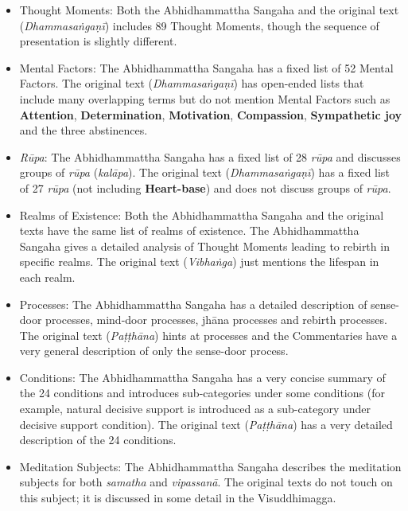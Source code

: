\begin{itemize}

\item Thought Moments: Both the Abhidhammattha Sangaha and the original text (\textit{Dhammasaṅgaṇī}) includes 89 Thought Moments, though the sequence of presentation is slightly different.

\item Mental Factors: The Abhidhammattha Sangaha has a fixed list of 52 Mental Factors. The original text (\textit{Dhammasaṅgaṇī}) has open-ended lists that include many overlapping terms but do not mention Mental Factors such as \textbf{Attention}, \textbf{Determination}, \textbf{Motivation}, \textbf{Compassion}, \textbf{Sympathetic joy} and the three abstinences.

\item \textit{Rūpa}: The Abhidhammattha Sangaha has a fixed list of 28 \textit{rūpa} and discusses groups of \textit{rūpa} (\textit{kalāpa}). The original text (\textit{Dhammasaṅgaṇī}) has a fixed list of 27 \textit{rūpa} (not including \textbf{Heart-base}) and does not discuss groups of \textit{rūpa}.

\item Realms of Existence: Both the Abhidhammattha Sangaha and the original texts have the same list of realms of existence. The Abhidhammattha Sangaha gives a detailed analysis of Thought Moments leading to rebirth in specific realms. The original text (\textit{Vibhaṅga}) just mentions the lifespan in each realm.

\item Processes: The Abhidhammattha Sangaha has a detailed description of sense-door processes, mind-door processes, jhāna processes and rebirth processes. The original text (\textit{Paṭṭhāna}) hints at processes and the Commentaries have a very general description of only the sense-door process.

\item Conditions: The Abhidhammattha Sangaha has a very concise summary of the 24 conditions and introduces sub-categories under some conditions (for example, natural decisive support is introduced as a sub-category under decisive support condition). The original text (\textit{Paṭṭhāna}) has a very detailed description of the 24 conditions.

\item Meditation Subjects: The Abhidhammattha Sangaha describes the meditation subjects for both \textit{samatha} and \textit{vipassanā}. The original texts do not touch on this subject; it is discussed in some detail in the Visuddhimagga.

\end{itemize}


